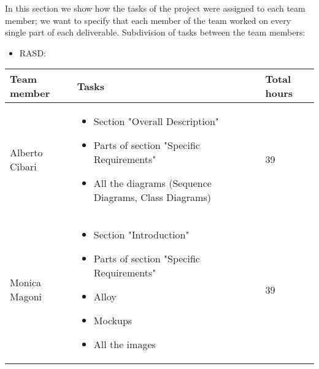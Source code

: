 In this section we show how the tasks of the project were assigned to each team member; we want to specify that each member of the team worked on every single part of each deliverable.
\newline
Subdivision of tasks between the team members:
\begin{itemize}
    \item RASD:
\end{itemize}
\begin{table}[H]
    \centering
    \begin{tabular}{|l|p{8cm}|l|}
        \hline
        \textbf{Team member} & \textbf{Tasks} & \textbf{Total hours}\\
        \hline
        Alberto Cibari & \begin{itemize}
            \item Section "Overall Description"
            \item Parts of section "Specific Requirements"
            \item All the diagrams (Sequence Diagrams, Class Diagrams)
        \end{itemize} & 39\\
        \hline
        Monica Magoni & \begin{itemize}
            \item Section "Introduction"
            \item Parts of section "Specific Requirements"
            \item Alloy 
            \item Mockups 
            \item All the images
        \end{itemize} & 39\\
        \hline
    \end{tabular}
\end{table}

